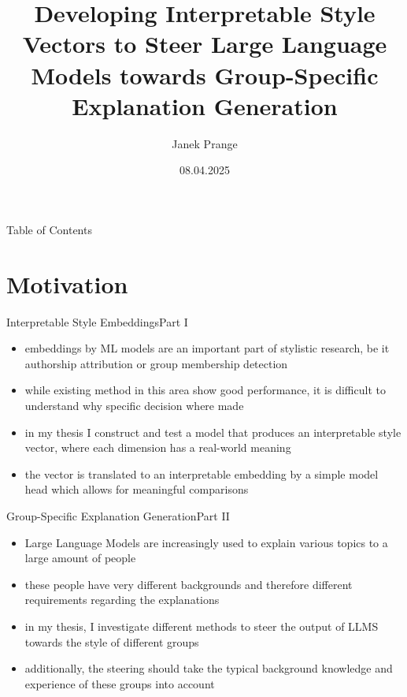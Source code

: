 \documentclass[]{beamer}
\title[Master's Thesis Presentation]{Developing Interpretable Style Vectors to Steer Large Language Models towards Group-Specific Explanation Generation}
\date{08.04.2025}
\author{Janek Prange}
\begin{document}
\begin{frame}
  \titlepage
\end{frame}

\begin{frame}[shrink,t]{Table of Contents}
  \tableofcontents
\end{frame}


\section{Motivation}
\begin{frame}{Interpretable Style Embeddings}{Part I}
  \begin{itemize}
    \item embeddings by ML models are an important part of stylistic research, be it authorship attribution or group membership detection
    \item while existing method in this area show good performance, it is difficult to understand why specific decision where made
          \pause
    \item in my thesis I construct and test a model that produces an interpretable style vector, where each dimension has a real-world meaning
    \item the vector is translated to an interpretable embedding by a simple model head which allows for meaningful comparisons
  \end{itemize}
\end{frame}

\begin{frame}{Group-Specific Explanation Generation}{Part II}
  \begin{itemize}
    \item Large Language Models are increasingly used to explain various topics to a large amount of people
    \item these people have very different backgrounds and therefore different requirements regarding the explanations
          \pause
    \item in my thesis, I investigate different methods to steer the output of LLMS towards the style of different groups
    \item additionally, the steering should take the typical background knowledge and experience of these groups into account
  \end{itemize}
\end{frame}
\end{document}
